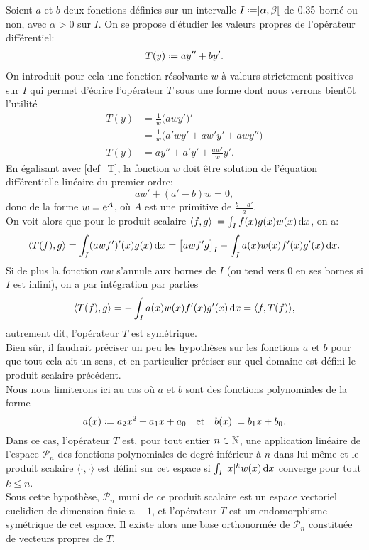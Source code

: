 Soient $a$ et $b$ deux fonctions définies sur un intervalle $I \defeq ] \alpha, \beta [$ de $0.35$ borné ou non, avec $\alpha > 0$ sur $I$. On se propose d'étudier les valeurs propres de l'opérateur différentiel:
\begin{align} \label{def_T}
    T(y) \defeq ay'' + by'.
\end{align}
On introduit pour cela une fonction résolvante $w$ à valeurs strictement positives sur $I$ qui permet d'écrire l'opérateur $T$ sous une forme dont nous verrons bientôt l'utilité
\begin{align*}
    T(y) &= \frac{1}{w} \big( a w y' \big)' \\
    &= \frac{1}{w} \big( a'w y' + a w' y' + a w y'' \big) \\
    T(y) &= ay'' + a'y' + \frac{aw'}{w}y'.
\end{align*}
En égalisant avec \ref{def_T}, la fonction $w$ doit être solution de l'équation différentielle linéaire du premier ordre:
$$a w' + (a' - b) w = 0,$$
donc de la forme $w = \mathrm{e}^A$, où $A$ est une primitive de $\frac{b-a'}{a}$. \\
On voit alors que pour le produit scalaire $\langle f, g \rangle \defeq \int_I f(x) g(x) w(x) \d x$, on a:
$$\langle T(f), g \rangle = \int_I (a w f')'(x) g(x) \, \mathrm{d} x = \big[ a w f' g \big]_I - \int_I a(x) w(x) f'(x) g'(x) \, \mathrm{d} x.$$
Si de plus la fonction $a w$ s'annule aux bornes de $I$ (ou tend vers $0$ en ses bornes si $I$ est infini), on a par intégration par parties
$$\langle T(f), g \rangle = - \int_I a(x) w(x) f'(x) g'(x) \, \mathrm{d} x = \langle f, T(f) \rangle,$$
autrement dit, l'opérateur $T$ est symétrique. \\
Bien sûr, il faudrait préciser un peu les hypothèses sur les fonctions $a$ et $b$ pour que tout cela ait un sens, et en particulier préciser sur quel domaine est défini le produit scalaire précédent. \\
Nous nous limiterons ici au cas où $a$ et $b$ sont des fonctions polynomiales de la forme
$$a(x) \defeq a_2 x^2 + a_1 x + a_0 \quad \text{et} \quad b(x) \defeq b_1 x + b_0.$$
Dans ce cas, l'opérateur $T$ est, pour tout entier $n \in \mathbb{N}$, une application linéaire de l'espace $\mathscr{P}_n$ des fonctions polynomiales de degré inférieur à $n$ dans lui-même et le produit scalaire $\langle \cdot, \cdot \rangle$ est défini sur cet espace si $\int_I |x|^k w(x) \, \mathrm{d} x$ converge pour tout $k \leqslant n$. \\
Sous cette hypothèse, $\mathscr{P}_n$ muni de ce produit scalaire est un espace vectoriel euclidien de dimension finie $n + 1$, et l'opérateur $T$ est un endomorphisme symétrique de cet espace. Il existe alors une base orthonormée de $\mathscr{P}_n$ constituée de vecteurs propres de $T$. \\
